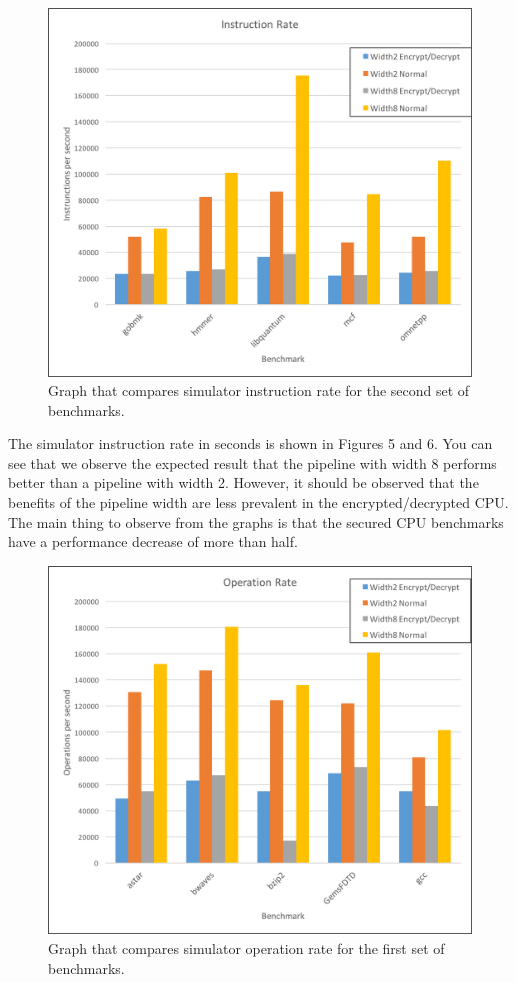 \documentclass[letterpaper, 10 pt, conference]{ieeeconf}  %
\begin{document}
\begin{figure}[thpb]
	\centering
	\includegraphics[scale=.45]{InstructionRate2}
   \caption{Graph that compares simulator instruction rate for the second set of benchmarks.}
\end{figure}

The simulator instruction rate in seconds is shown in Figures 5 and 6.  You can see that we observe the expected result that the pipeline with width 8 performs better than a pipeline with width 2.  However, it should be observed that the benefits of the pipeline width are less prevalent in the encrypted/decrypted CPU.  The main thing to observe from the graphs is that the secured CPU benchmarks have a performance decrease of more than half.

\begin{figure}[thpb]
	\centering
	\includegraphics[scale=.45]{OperationsRate1}
   \caption{Graph that compares simulator operation rate for the first set of benchmarks.}
\end{figure}
\end{document}
